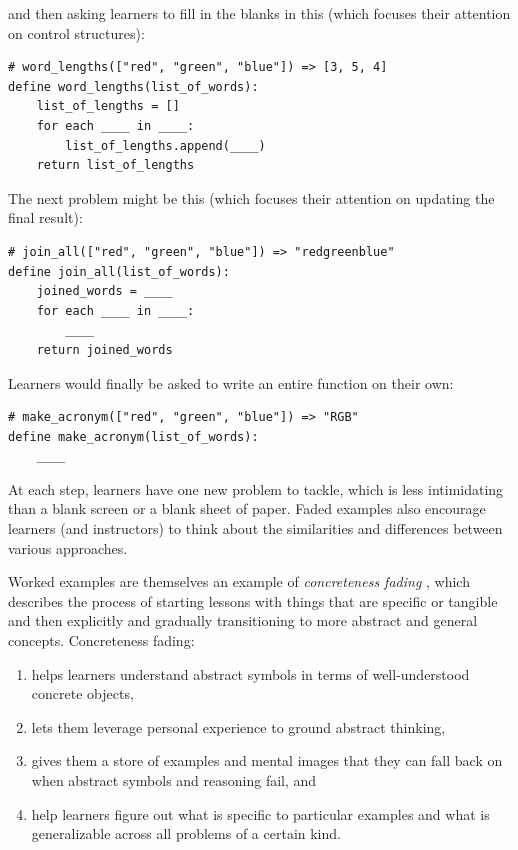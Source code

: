 \documentclass[10pt,letterpaper]{article}
\begin{document}
and then asking learners to fill in the blanks in this (which focuses their
attention on control structures):

\begin{verbatim}
# word_lengths(["red", "green", "blue"]) => [3, 5, 4]
define word_lengths(list_of_words):
    list_of_lengths = []
    for each ____ in ____:
        list_of_lengths.append(____)
    return list_of_lengths
\end{verbatim}

The next problem might be this (which focuses their attention on updating the
final result):

\begin{verbatim}
# join_all(["red", "green", "blue"]) => "redgreenblue"
define join_all(list_of_words):
    joined_words = ____
    for each ____ in ____:
        ____
    return joined_words
\end{verbatim}

Learners would finally be asked to write an entire function on their own:

\begin{verbatim}
# make_acronym(["red", "green", "blue"]) => "RGB"
define make_acronym(list_of_words):
    ____
\end{verbatim}

At each step, learners have one new problem to tackle, which is less
intimidating than a blank screen or a blank sheet of paper.  Faded examples also
encourage learners (and instructors) to think about the similarities and
differences between various approaches.

Worked examples are themselves an example of \emph{concreteness fading}
\cite{Gold2005,Fyfe2014}, which describes the process of starting lessons with
things that are specific or tangible and then explicitly and gradually
transitioning to more abstract and general concepts.  Concreteness fading:

\begin{enumerate}

\item helps learners understand abstract symbols in terms of well-understood
  concrete objects,

\item lets them leverage personal experience to ground abstract thinking,

\item gives them a store of examples and mental images that they can fall back
  on when abstract symbols and reasoning fail, and

\item help learners figure out what is specific to particular examples and what
  is generalizable across all problems of a certain kind.

\end{enumerate}
\end{document}
